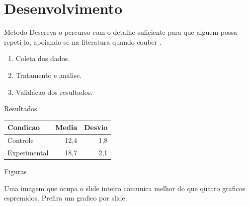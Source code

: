 \section{Desenvolvimento}

\begin{frame}{Metodo}
  Descreva o percurso com o detalhe suficiente para que alguem possa repeti-lo,
  apoiando-se na literatura quando couber \cite{exemplo2024}.

  \vspace{1em}
  \begin{enumerate}
    \item Coleta dos dados.
    \item Tratamento e analise.
    \item Validacao dos resultados.
  \end{enumerate}
\end{frame}

\begin{frame}{Resultados}
  \begin{table}
    \centering
    \begin{tabular}{lrr}
      \toprule
      \textbf{Condicao} & \textbf{Media} & \textbf{Desvio} \\
      \midrule
      Controle      & 12,4 & 1,8 \\
      Experimental  & 18,7 & 2,1 \\
      \bottomrule
    \end{tabular}
  \end{table}
\end{frame}

\begin{frame}{Figuras}

  Uma imagem que ocupa o slide inteiro comunica melhor do que quatro graficos
  espremidos. Prefira \alert{um grafico por slide}.
\end{frame}
